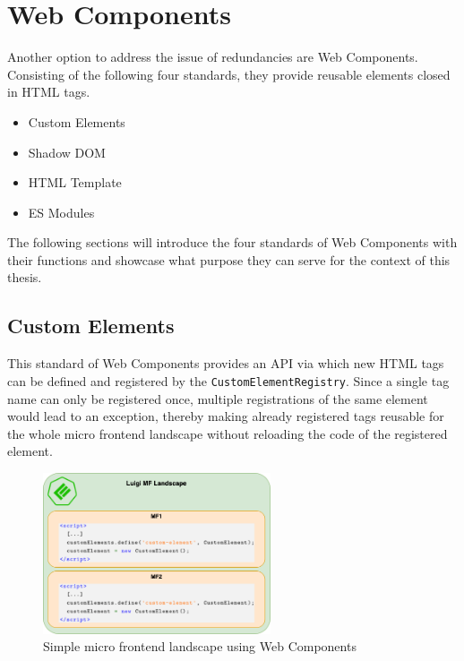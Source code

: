 \chapter{Web Components} %
\label{Chapter4}


Another option to address the issue of redundancies are Web Components. Consisting of the following four standards, they provide reusable elements closed in HTML tags.\cite{mdn_web_docs}

\begin{itemize}[noitemsep]
	\item Custom Elements
	\item Shadow DOM
	\item HTML Template
	\item ES Modules
\end{itemize}

The following sections will introduce the four standards of Web Components with their functions and showcase what purpose they can serve for the context of this thesis.

\section{Custom Elements}

This standard of Web Components provides an API via which new HTML tags can be defined and registered by the \texttt{CustomElementRegistry}. Since a single tag name can only be registered once, multiple registrations of the same element would lead to an exception, thereby making already registered tags reusable for the whole micro frontend landscape without reloading the code of the registered element.\cite{google_reusable_wcs}

\begin{figure}[!h]
	\centering
	\includegraphics[width=0.6\textwidth]{Figures/customElements_registered.drawio.png}
	\caption{Simple micro frontend landscape using Web Components}
	\label{fig:same_wc_example}
\end{figure}

